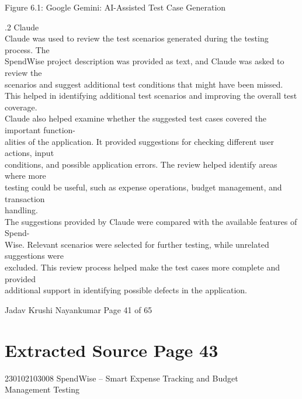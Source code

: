\documentclass[12pt,a4paper]{report}
\begin{document}
\smallskip

\smallskip
Figure 6.1: Google Gemini: AI-Assisted Test Case Generation\\ 

\smallskip

\smallskip

.2 Claude\\ 

\smallskip
Claude was used to review the test scenarios generated during the testing process. The\\ 
SpendWise project description was provided as text, and Claude was asked to review the\\ 
scenarios and suggest additional test conditions that might have been missed.\\ 
This helped in identifying additional test scenarios and improving the overall test coverage.\\ 
Claude also helped examine whether the suggested test cases covered the important function-\\ 
alities of the application. It provided suggestions for checking different user actions, input\\ 
conditions, and possible application errors. The review helped identify areas where more\\ 
testing could be useful, such as expense operations, budget management, and transaction\\ 
handling.\\ 
The suggestions provided by Claude were compared with the available features of Spend-\\ 
Wise. Relevant scenarios were selected for further testing, while unrelated suggestions were\\ 
excluded. This review process helped make the test cases more complete and provided\\ 
additional support in identifying possible defects in the application.\\ 

\smallskip

\smallskip

\smallskip

\smallskip
Jadav Krushi Nayankumar                                                       Page 41 of 65\\ 

\clearpage
\section*{Extracted Source Page 43}
230102103008                          SpendWise – Smart Expense Tracking and Budget\\ 
Management Testing\\ 
\end{document}
